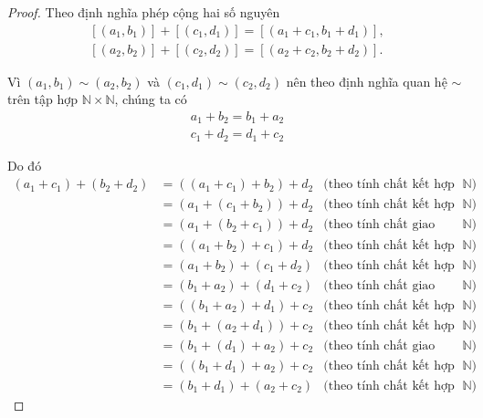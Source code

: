 \begin{proof}
	Theo định nghĩa phép cộng hai số nguyên
	\[
		\begin{split}
			[(a_{1}, b_{1})] + [(c_{1}, d_{1})] = [(a_{1}+c_{1}, b_{1}+d_{1})], \\
			[(a_{2}, b_{2})] + [(c_{2}, d_{2})] = [(a_{2}+c_{2}, b_{2}+d_{2})].
		\end{split}
	\]

	Vì $(a_{1}, b_{1}) \sim (a_{2}, b_{2})$ và $(c_{1}, d_{1})\sim (c_{2}, d_{2})$ nên theo định nghĩa quan hệ $\sim$ trên tập hợp $\mathbb{N}\times\mathbb{N}$, chúng ta có
	\[
		\begin{split}
			a_{1} + b_{2} = b_{1} + a_{2} \\
			c_{1} + d_{2} = d_{1} + c_{2}
		\end{split}
	\]

	Do đó
	\begin{align*}
		(a_{1} + c_{1}) + (b_{2} + d_{2}) & = ((a_{1} + c_{1}) + b_{2}) + d_{2} & \text{(theo tính chất kết hợp của phép cộng trên $\mathbb{N}$)}   \\
		                                  & = (a_{1} + (c_{1} + b_{2})) + d_{2} & \text{(theo tính chất kết hợp của phép cộng trên $\mathbb{N}$)}   \\
		                                  & = (a_{1} + (b_{2} + c_{1})) + d_{2} & \text{(theo tính chất giao hoán của phép cộng trên $\mathbb{N}$)} \\
		                                  & = ((a_{1} + b_{2}) + c_{1}) + d_{2} & \text{(theo tính chất kết hợp của phép cộng trên $\mathbb{N}$)}   \\
		                                  & = (a_{1} + b_{2}) + (c_{1} + d_{2}) & \text{(theo tính chất kết hợp của phép cộng trên $\mathbb{N}$)}   \\
		                                  & = (b_{1} + a_{2}) + (d_{1} + c_{2}) & \text{(theo tính chất giao hoán của phép cộng trên $\mathbb{N}$)} \\
		                                  & = ((b_{1} + a_{2}) + d_{1}) + c_{2} & \text{(theo tính chất kết hợp của phép cộng trên $\mathbb{N}$)}   \\
		                                  & = (b_{1} + (a_{2} + d_{1})) + c_{2} & \text{(theo tính chất kết hợp của phép cộng trên $\mathbb{N}$)}   \\
		                                  & = (b_{1} + (d_{1}) + a_{2}) + c_{2} & \text{(theo tính chất giao hoán của phép cộng trên $\mathbb{N}$)} \\
		                                  & = ((b_{1} + d_{1}) + a_{2}) + c_{2} & \text{(theo tính chất kết hợp của phép cộng trên $\mathbb{N}$)}   \\
		                                  & = (b_{1} + d_{1}) + (a_{2} + c_{2}) & \text{(theo tính chất kết hợp của phép cộng trên $\mathbb{N}$)}
	\end{align*}


\end{proof}
